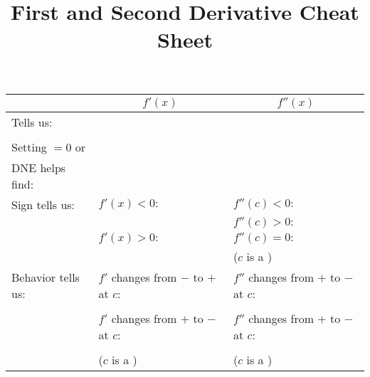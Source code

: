 \documentclass{siproblemset}
\title{First and Second Derivative Cheat Sheet}
\newcommand*{\thead}[1]{\multicolumn{1}{c|}{\bfseries #1}}
\begin{document}
    \maketitle
    \vspace{-1cm}
    \begin{center}
        \begin{tabular}{|l|l|l|}
            \hline
            & \thead{$f'(x)$} & \thead{$f''(x)$} \\
            \hline
            Tells us: &\hspace{6cm} &\hspace{6cm} \\
            & & \\
            \hline
            Setting $=0$ or & & \\ DNE helps find:& & \\
            \hline
            Sign tells us:& $f'(x) < 0:$ &  $f''(c) < 0:$ \\
            &  &  $f''(c) > 0:$ \\ 
            & $f'(x) > 0:$ &  $f''(c) = 0:$ \\
            & &($c$ is a \underline{\hspace{5cm}}) \\
            \hline
            Behavior tells us:&  $f'$ changes from $-$ to $+$ at $c$:  &  $f''$ changes from $+$ to $-$ at $c$: \\
            & & \\
            & $f'$ changes from $+$ to $-$ at $c$: &  $f''$ changes from $+$ to $-$ at $c$: \\
            &  & \\
            & ($c$ is a \underline{\hspace{5cm}})&($c$ is a \underline{\hspace{5cm}}) \\
            \hline
        \end{tabular}
    
    \vspace{0.5cm}
    
    \end{center}
\end{document}
